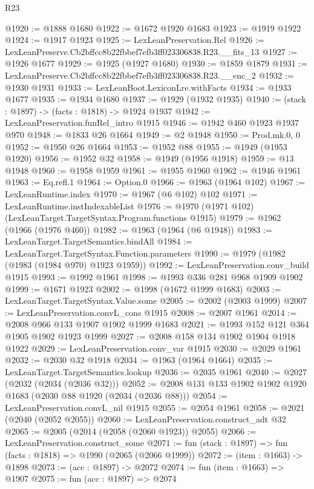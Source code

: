 \begin{lexlean}{R23}
\begin{coremodule}
@1920 := @1888 @1680
@1922 := @1672 @1920 @1683
@1923 := @1919 @1922
@1924 := @1917 @1923
@1925 := LexLeanPreservation.Rel
@1926 := LexLeanPreserve.Cb2bffcc8b22fbbef7efb3ff023306838.R23.__fits_13
@1927 := @1926 @1677
@1929 := @1925 (@1927 @1680)
@1930 := @1859 @1879
@1931 := LexLeanPreserve.Cb2bffcc8b22fbbef7efb3ff023306838.R23.__enc_2
@1932 := @1930 @1931
@1933 := LexLeanBoot.LexiconLre.withFacts
@1934 := @1933 @1677
@1935 := @1934 @1680
@1937 := @1929 (@1932 @1935)
@1940 := (stack : @1897) -> (facts : @1818) -> @1924 @1937
@1942 := LexLeanPreservation.funRel_intro @1915
@1946 := @1942 @460 @1923 @1937 @970
@1948 := @1833 @26 @1664
@1949 := @2 @1948
@1950 := Prod.mk.{0, 0}
@1952 := @1950 @26 @1664
@1953 := @1952 @88
@1955 := @1949 (@1953 @1920)
@1956 := @1952 @32
@1958 := @1949 (@1956 @1918)
@1959 := @13 @1948
@1960 := @1958 @1959
@1961 := @1955 @1960
@1962 := @1946 @1961
@1963 := Eq.refl.{1}
@1964 := Option.{0}
@1966 := @1963 (@1964 @102)
@1967 := LexLeanRuntime.index
@1970 := @1967 (@6 @102) @102
@1971 := LexLeanRuntime.instIndexableList
@1976 := @1970 (@1971 @102) (LexLeanTarget.TargetSyntax.Program.functions @1915)
@1979 := @1962 (@1966 (@1976 @460))
@1982 := @1963 (@1964 (@6 @1948))
@1983 := LexLeanTarget.TargetSemantics.bindAll
@1984 := LexLeanTarget.TargetSyntax.Function.parameters
@1990 := @1979 (@1982 (@1983 (@1984 @970) @1923 @1959))
@1992 := LexLeanPreservation.conv_build @1915
@1993 := @1992 @1961
@1998 := @1993 @336 @281 @968 @1909 @1902
@1999 := @1671 @1923
@2002 := @1998 (@1672 @1999 @1683)
@2003 := LexLeanTarget.TargetSyntax.Value.some
@2005 := @2002 (@2003 @1999)
@2007 := LexLeanPreservation.convL_cons @1915
@2008 := @2007 @1961
@2014 := @2008 @966 @133 @1907 @1902 @1999 @1683
@2021 := @1993 @152 @121 @364 @1905 @1902 @1923 @1999
@2027 := @2008 @158 @134 @1902 @1904 @1918 @1922
@2029 := LexLeanPreservation.conv_var @1915
@2030 := @2029 @1961
@2032 := @2030 @32 @1918
@2034 := @1963 (@1964 @1664)
@2035 := LexLeanTarget.TargetSemantics.lookup
@2036 := @2035 @1961
@2040 := @2027 (@2032 (@2034 (@2036 @32)))
@2052 := @2008 @131 @133 @1902 @1902 @1920 @1683 (@2030 @88 @1920 (@2034 (@2036 @88)))
@2054 := LexLeanPreservation.convL_nil @1915
@2055 := @2054 @1961
@2058 := @2021 (@2040 (@2052 @2055))
@2060 := LexLeanPreservation.construct_adt @32
@2065 := @2005 (@2014 (@2058 (@2060 @1923)) @2055)
@2066 := LexLeanPreservation.construct_some
@2071 := fun (stack : @1897) => fun (facts : @1818) => @1990 (@2065 (@2066 @1999))
@2072 := (item : @1663) -> @1898
@2073 := (acc : @1897) -> @2072
@2074 := fun (item : @1663) => @1907
@2075 := fun (acc : @1897) => @2074

\end{coremodule}
\end{lexlean}
